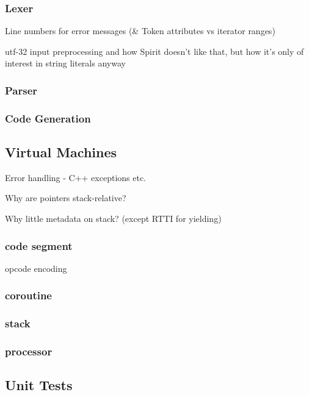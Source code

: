             \subsubsection{Lexer}
            Line numbers for error messages (\& Token attributes vs iterator ranges)
            
            utf-32 input preprocessing and how Spirit doesn't like that, but how it's only of interest in string literals anyway
            
            \subsubsection{Parser}
            
            \subsubsection{Code Generation}
            
        \subsection{Virtual Machines}
        
            Error handling - C++ exceptions etc.
            
            Why are pointers stack-relative?
            
            Why little metadata on stack? (except RTTI for yielding)
            
            \subsubsection{code segment}
                opcode encoding
            \subsubsection{coroutine}
            \subsubsection{stack}
            \subsubsection{processor}
        
        \subsection{Unit Tests}


